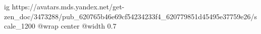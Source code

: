  
 
 
 
 

\ifcmt
  ig https://avatars.mds.yandex.net/get-zen_doc/3473288/pub_620765b46e69cf54234233f4_620779851d45495e37759e26/scale_1200
  @wrap center
  @width 0.7
\fi
